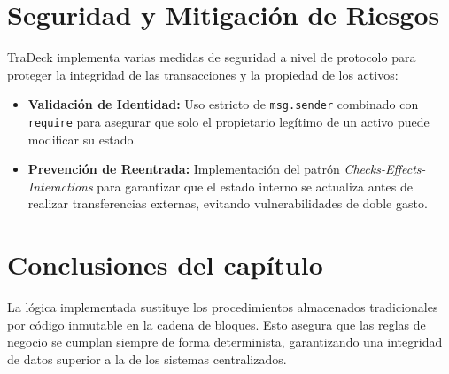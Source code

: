 \section{Seguridad y Mitigación de Riesgos}
TraDeck implementa varias medidas de seguridad a nivel de protocolo para proteger
la integridad de las transacciones y la propiedad de los activos:
\begin{itemize}
	\item \textbf{Validación de Identidad:} Uso estricto de \texttt{msg.sender} 
	combinado con \texttt{require} para asegurar que solo el propietario 
	legítimo de un activo puede modificar su estado.
	\item \textbf{Prevención de Reentrada:} Implementación del patrón 
	\textit{Checks-Effects-Interactions} para garantizar que el estado 
	interno se actualiza antes de realizar transferencias externas, evitando 
	vulnerabilidades de doble gasto.
\end{itemize}

\section{Conclusiones del capítulo}
La lógica implementada sustituye los procedimientos almacenados tradicionales por 
código inmutable en la cadena de bloques. Esto asegura que las reglas de negocio 
se cumplan siempre de forma determinista, garantizando una integridad de datos 
superior a la de los sistemas centralizados.